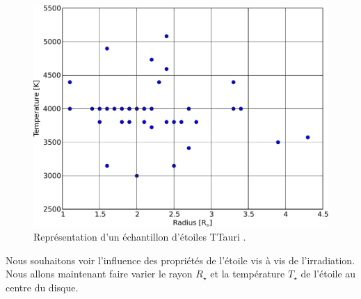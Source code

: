 \begin{figure}[htb]
\centering
\includegraphics[width=0.5\linewidth]{figure/TTauri_sample.pdf}
\caption{Représentation d'un échantillon d'étoiles TTauri \citep{hartigan1995disk}. }\label{fig:TTauri_sample}
\end{figure}

Nous souhaitons voir l'influence des propriétés de l'étoile vis à vis de l'irradiation. Nous allons maintenant faire varier le rayon $R_\star$ et la température $T_\star$ de l'étoile au centre du disque. 

